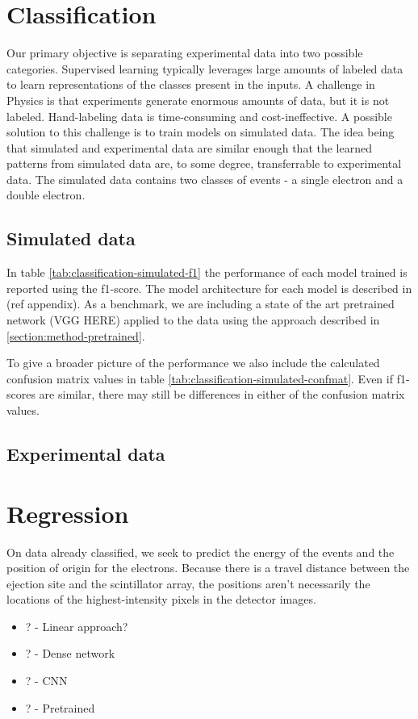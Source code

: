 \section{Classification}
Our primary objective is separating experimental data into two possible categories.
Supervised learning typically leverages large amounts of labeled data to learn
representations of the classes present in the inputs. A challenge in Physics is that
experiments generate enormous amounts of data, but it is not labeled. Hand-labeling
data is time-consuming and cost-ineffective. A possible solution to this challenge
is to train models on simulated data. The idea being that simulated and experimental
data are similar enough that the learned patterns from simulated data are, to some degree,
transferrable to experimental data.
The simulated data contains two classes of events - a single electron and a double electron.

\subsection{Simulated data}
In table \ref{tab:classification-simulated-f1} the performance of each model 
trained is reported using the f1-score. The model architecture for each model is described in (ref appendix).
As a benchmark, we are including a state of the art pretrained network (\cite{}VGG HERE) applied to the data 
using the approach described in \ref{section:method-pretrained}.

To give a broader picture of the performance we also include the calculated confusion matrix values in
table \ref{tab:classification-simulated-confmat}. Even if f1-scores are similar, there may still be differences
in either of the confusion matrix values.



\subsection{Experimental data}
\section{Regression}
On data already classified, we seek to predict the energy of the events and the position of origin for
the electrons. Because there is a travel distance between the ejection site and the scintillator array,
the positions aren't necessarily the locations of the highest-intensity pixels in the detector images.
\begin{itemize}
  \item ? - Linear approach?
  \item ? - Dense network
  \item ? - CNN
  \item ? - Pretrained
\end{itemize}
